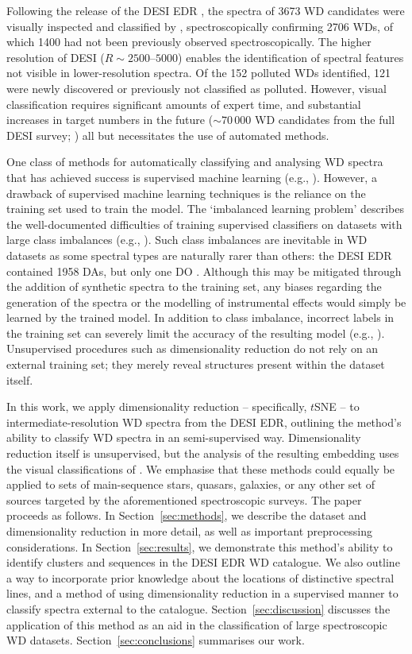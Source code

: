 \documentclass[fleqn,usenatbib]{mnras}
\begin{document}
Following the release of the DESI EDR \citep{desiedr}, the spectra of 3673 WD candidates were visually inspected and classified by \citet{manser24}, spectroscopically confirming 2706 WDs, of which 1400 had not been previously observed spectroscopically.
The higher resolution of DESI ($R\sim2500$--$5000$) enables the identification of spectral features not visible in lower-resolution spectra.
Of the 152 polluted WDs identified, 121 were newly discovered or previously not classified as polluted.
However, visual classification requires significant amounts of expert time, and substantial increases in target numbers in the future ($\sim70\,000$ WD candidates from the full DESI survey; \citealt{cooper23}) all but necessitates the use of automated methods.

One class of methods for automatically classifying and analysing WD spectra that has achieved success is supervised machine learning (e.g., \citealt{yang20, tan23, garciazamora23, vincent23, vincent24}).
However, a drawback of supervised machine learning techniques is the reliance on the training set used to train the model.
The `imbalanced learning problem' describes the well-documented difficulties of training supervised classifiers on datasets with large class imbalances (e.g., \citealt{he09, johnson19}).
Such class imbalances are inevitable in WD datasets as some spectral types are naturally rarer than others: the DESI EDR contained 1958 DAs, but only one DO \citep{manser24}.
Although this may be mitigated through the addition of synthetic spectra to the training set, any biases regarding the generation of the spectra or the modelling of instrumental effects would simply be learned by the trained model.
In addition to class imbalance, incorrect labels in the training set can severely limit the accuracy of the resulting model (e.g., \citealt{frenay14}).
Unsupervised procedures such as dimensionality reduction do not rely on an external training set; they merely reveal structures present within the dataset itself.

In this work, we apply dimensionality reduction -- specifically, $t$SNE -- to intermediate-resolution WD spectra from the DESI EDR, outlining the method's ability to classify WD spectra in an semi-supervised way.
Dimensionality reduction itself is unsupervised, but the analysis of the resulting embedding uses the visual classifications of \citet{manser24}.
We emphasise that these methods could equally be applied to sets of main-sequence stars, quasars, galaxies, or any other set of sources targeted by the aforementioned spectroscopic surveys.
The paper proceeds as follows.
In Section~\ref{sec:methods}, we describe the dataset and dimensionality reduction in more detail, as well as important preprocessing considerations.
In Section~\ref{sec:results}, we demonstrate this method's ability to identify clusters and sequences in the DESI EDR WD catalogue.
We also outline a way to incorporate prior knowledge about the locations of distinctive spectral lines, and a method of using dimensionality reduction in a supervised manner to classify spectra external to the catalogue.
Section~\ref{sec:discussion} discusses the application of this method as an aid in the classification of large spectroscopic WD datasets.
Section~\ref{sec:conclusions} summarises our work.
\end{document}
